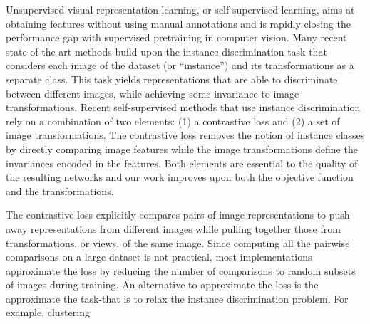 \documentclass[conference]{IEEEtran}
\begin{document}
Unsupervised visual representation learning, or self-supervised learning, aims at obtaining features without using manual annotations and is rapidly closing the performance gap with supervised pretraining in computer vision.
Many recent state-of-the-art methods build upon the instance discrimination task that considers each image of the dataset (or ``instance'') and its transformations as a separate class.
This task yields representations that are able to discriminate between different images, while achieving some invariance to image transformations.
Recent self-supervised methods that use instance discrimination rely on a combination of two elements: (1) a contrastive loss and (2) a set of image transformations.
The contrastive loss removes the notion of instance classes by directly comparing image features while the image transformations define the invariances encoded in the features.
Both elements are essential to the quality of the resulting networks and our work improves upon both the objective function and the transformations.

The contrastive loss explicitly compares pairs of image representations to push away representations from different images while pulling together those from transformations, or views, of the same image.
Since computing all the pairwise comparisons on a large dataset is not practical, most implementations approximate the loss by reducing the number of comparisons to random subsets of images during training.
An alternative to approximate the loss is the approximate the task-that is to relax the instance discrimination problem. 
For example, clustering



\end{document}
